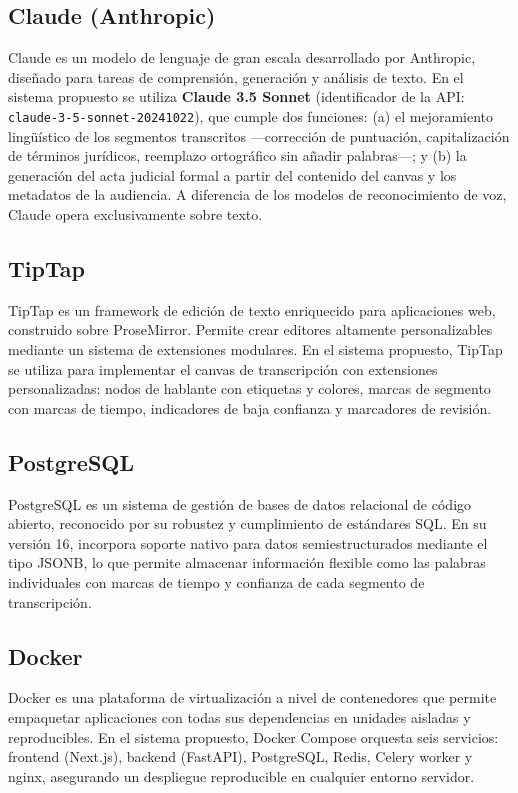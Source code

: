 \documentclass[12pt,a4paper,oneside]{report}
\begin{document}
\subsection{Claude (Anthropic)}

Claude es un modelo de lenguaje de gran escala desarrollado por Anthropic, diseñado para tareas de comprensión, generación y análisis de texto. En el sistema propuesto se utiliza \textbf{Claude 3.5 Sonnet} (identificador de la API: \texttt{claude-3-5-sonnet-20241022}), que cumple dos funciones: (a) el mejoramiento lingüístico de los segmentos transcritos ---corrección de puntuación, capitalización de términos jurídicos, reemplazo ortográfico sin añadir palabras---; y (b) la generación del acta judicial formal a partir del contenido del canvas y los metadatos de la audiencia. A diferencia de los modelos de reconocimiento de voz, Claude opera exclusivamente sobre texto.

\subsection{TipTap}

TipTap es un framework de edición de texto enriquecido para aplicaciones web, construido sobre ProseMirror. Permite crear editores altamente personalizables mediante un sistema de extensiones modulares. En el sistema propuesto, TipTap se utiliza para implementar el canvas de transcripción con extensiones personalizadas: nodos de hablante con etiquetas y colores, marcas de segmento con marcas de tiempo, indicadores de baja confianza y marcadores de revisión.

\subsection{PostgreSQL}

PostgreSQL es un sistema de gestión de bases de datos relacional de código abierto, reconocido por su robustez y cumplimiento de estándares SQL. En su versión 16, incorpora soporte nativo para datos semiestructurados mediante el tipo JSONB, lo que permite almacenar información flexible como las palabras individuales con marcas de tiempo y confianza de cada segmento de transcripción.

\subsection{Docker}

Docker es una plataforma de virtualización a nivel de contenedores que permite empaquetar aplicaciones con todas sus dependencias en unidades aisladas y reproducibles. En el sistema propuesto, Docker Compose orquesta seis servicios: frontend (Next.js), backend (FastAPI), PostgreSQL, Redis, Celery worker y nginx, asegurando un despliegue reproducible en cualquier entorno servidor.
\end{document}
